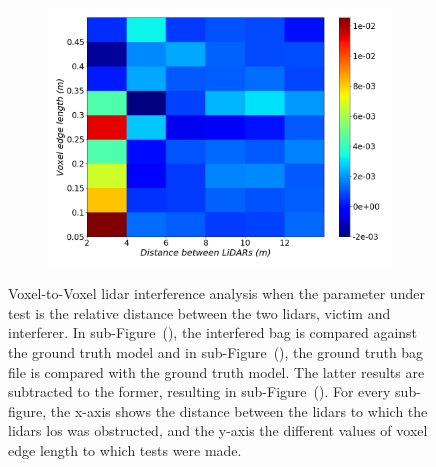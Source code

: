 \begin{figure}[!ht]
\begin{subfigure}[c]{0.45\textwidth}
	\label{fig:los:octree-ground-truth-color-mesh}
\end{subfigure}
\\ \vspace{4mm}
\begin{subfigure}[c]{0.6\textwidth}
	\includegraphics[width=\textwidth]{img/lidar-interference/LOS/octree_difference_color_mesh.png}
	\caption{}%
	\label{fig:los:octree-difference-color-mesh}
\end{subfigure}

\caption[Voxel-to-Voxel analysis when the \acp{lidar} \ac{los} is obstructed and the distance between \acp{lidar} is variated.]{Voxel-to-Voxel \ac{lidar} interference analysis when the parameter under test is the relative distance between the two \acp{lidar}, victim and interferer. In sub-Figure~(), the interfered bag is compared against the ground truth model and in sub-Figure~(), the ground truth bag file is compared with the ground truth model. The latter results are subtracted to the former, resulting in sub-Figure~(). For every sub-figure, the x-axis shows the distance between the \acp{lidar} to which the \acp{lidar} \ac{los} was obstructed, and the y-axis the different values of voxel edge length to which tests were made.}
\label{fig:los:octree-color-mesh}
\end{figure}

